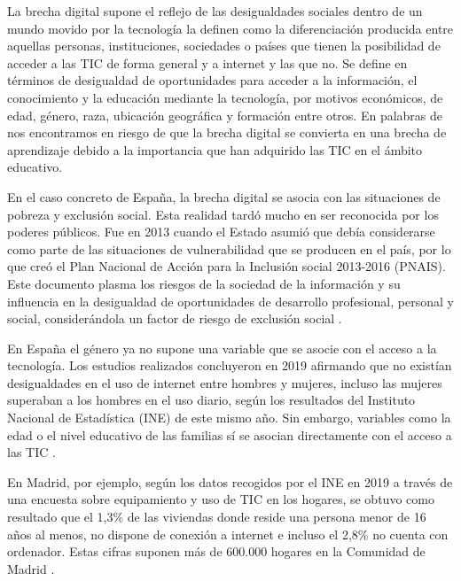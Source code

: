 \documentclass[spanish]{textolivre}
\begin{document}
La brecha digital supone el reflejo de las desigualdades sociales dentro de un mundo  movido por la tecnología \textcite{caberoalmenara2017} la definen como la diferenciación producida entre aquellas personas, instituciones, sociedades o países que tienen la posibilidad de acceder a las TIC de forma general y a internet y las que no. Se define en términos de desigualdad de oportunidades para acceder a la información, el conocimiento y la educación mediante la tecnología, por motivos económicos, de edad, género, raza, ubicación geográfica y formación entre otros. En palabras de \textcite{cervantesholguin2020} nos encontramos en riesgo de que la brecha digital se convierta en una brecha de aprendizaje debido a la importancia que han adquirido las TIC en el ámbito educativo.

En el caso concreto de España, la brecha digital se asocia con las situaciones de pobreza y exclusión social. Esta realidad tardó mucho en ser reconocida por los poderes públicos. Fue en 2013 cuando el Estado asumió que debía considerarse como parte de las situaciones de vulnerabilidad que se producen en el país, por lo que creó el Plan Nacional de Acción para la Inclusión social 2013-2016 (PNAIS). Este documento plasma los riesgos de la sociedad de la información y su influencia en la desigualdad de oportunidades de desarrollo profesional, personal y social, considerándola un factor de riesgo de exclusión social \cite{rodiciogarcia2020}.

En España el género ya no supone una variable que se asocie con el acceso a la tecnología. Los estudios realizados concluyeron en 2019 afirmando que no existían desigualdades en el uso de internet entre hombres y mujeres, incluso las mujeres superaban a los hombres en el uso diario, según los resultados del Instituto Nacional de Estadística (INE) de este mismo año. Sin embargo, variables como la edad o el nivel educativo de las familias sí se asocian directamente con el acceso a las TIC \cite{acosta2020}.

En Madrid, por ejemplo, según los datos recogidos por el INE en 2019 a través de una encuesta sobre equipamiento y uso de TIC en los hogares, se obtuvo como resultado que el 1,3\% de las viviendas donde reside una persona menor de 16 años al menos, no dispone de conexión a internet e incluso el 2,8\% no cuenta con ordenador. Estas cifras suponen más de 600.000 hogares en la Comunidad de Madrid \cite{martinezlopez2020}.
\end{document}

